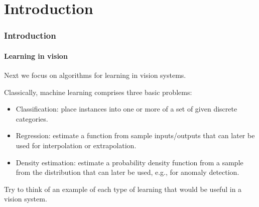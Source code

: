 \documentclass[aspectratio=169]{beamer}
\begin{document}
\section{Introduction}

\begin{frame}
\frametitle{Introduction}
\framesubtitle{Learning in vision}

Next we focus on algorithms for \alert{learning} in vision
systems.

\medskip

Classically, machine learning comprises three basic problems:
\begin{itemize}
    \item \alert{Classification}: place instances into one or more of a
        set of given discrete \alert{categories}.
    \item \alert{Regression}: estimate a function from sample
        inputs/outputs that can later be used for \alert{interpolation} or
        \alert{extrapolation}.
    \item \alert{Density estimation}: estimate a probability density
        function from a sample from the distribution that can later be used,
        e.g., for \alert{anomaly detection}.
\end{itemize}

\medskip

Try to think of an example of each type of learning that would be
useful in a vision system.

\end{frame}
\end{document}

